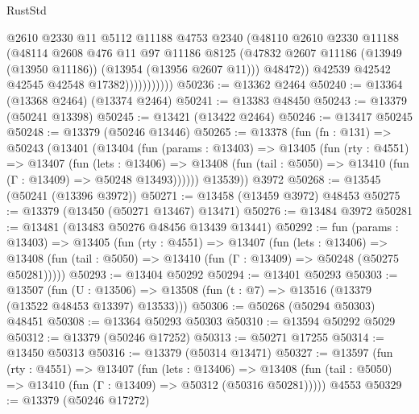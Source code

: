 \begin{lexlean}{RustStd}
\begin{coremodule}
                          @2610
                          @2330
                          @11
                          @5112
                          @11188
                          @4753
                          @2340
                          (@48110
                            @2610
                            @2330
                            @11188
                            (@48114
                              @2608
                              @476
                              @11
                              @97
                              @11186
                              @8125
                              (@47832
                                @2607
                                @11186
                                (@13949 (@13950 @11186))
                                (@13954 (@13956 @2607 @11)))
                              @48472))
                          @42539
                          @42542
                          @42545
                          @42548
                          @17382)))))))))))
@50236 := @13362 @2464
@50240 := @13364 (@13368 @2464) (@13374 @2464)
@50241 := @13383 @48450
@50243 := @13379 (@50241 @13398)
@50245 := @13421 (@13422 @2464)
@50246 := @13417 @50245
@50248 := @13379 (@50246 @13446)
@50265 := @13378
    (fun (fn : @131) =>
    @50243
      (@13401
        (@13404
          (fun (params : @13403) =>
          @13405
            (fun (rty : @4551) =>
            @13407
              (fun (lets : @13406) =>
              @13408 (fun (tail : @5050) => @13410 (fun (Γ : @13409) => @50248 @13493))))))
        @13539))
    @3972
@50268 := @13545 (@50241 (@13396 @3972))
@50271 := @13458 (@13459 @3972) @48453
@50275 := @13379 (@13450 (@50271 @13467) @13471)
@50276 := @13484 @3972
@50281 := @13481 (@13483 @50276 @48456 @13439 @13441)
@50292 := fun (params : @13403) =>
  @13405
    (fun (rty : @4551) =>
    @13407
      (fun (lets : @13406) =>
      @13408 (fun (tail : @5050) => @13410 (fun (Γ : @13409) => @50248 (@50275 @50281)))))
@50293 := @13404 @50292
@50294 := @13401 @50293
@50303 := @13507
    (fun (U : @13506) => @13508 (fun (t : @7) => @13516 (@13379 (@13522 @48453 @13397) @13533)))
@50306 := @50268 (@50294 @50303) @48451
@50308 := @13364 @50293 @50303
@50310 := @13594 @50292 @5029
@50312 := @13379 (@50246 @17252)
@50313 := @50271 @17255
@50314 := @13450 @50313
@50316 := @13379 (@50314 @13471)
@50327 := @13597
    (fun (rty : @4551) =>
    @13407
      (fun (lets : @13406) =>
      @13408 (fun (tail : @5050) => @13410 (fun (Γ : @13409) => @50312 (@50316 @50281)))))
    @4553
@50329 := @13379 (@50246 @17272)

\end{coremodule}
\end{lexlean}
